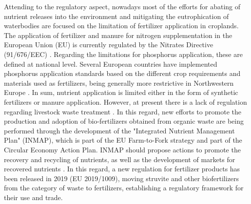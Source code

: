 \begin{refsection}[referencesCh1]
Attending to the regulatory aspect, nowadays most of the efforts for abating of nutrient releases into the environment and mitigating the eutrophication of waterbodies are focused on the limitation of fertilizer application in croplands. The application of fertilizer and manure for nitrogen supplementation in the European Union (EU) is currently regulated by the Nitrates Directive (91/676/EEC) \citep{GRIZZETTI2021102281}. Regarding the limitations for phosphorus application, these are defined at national level. Several European countries have implemented phosphorus application standards based on the different crop requirements and materials used as fertilizers,
being generally more restrictive in Northwestern Europe \citep{amery2014agricultural}. 
In sum, nutrient application is limited either in the form of synthetic fertilizers or manure application. However, at present there is a lack of regulation regarding livestock waste treatment \citep{Piot_Lepetit2012}. In this regard, new efforts to promote the production and adoption of bio-fertilizers obtained from organic waste are being performed through the development of the "Integrated Nutrient Management Plan" (INMAP), which is part of the EU Farm-to-Fork strategy and part of the Circular Economy Action Plan. INMAP should propose actions to promote the recovery and recycling of nutrients, as well as the development of markets for recovered nutrients \citep{ESSP2021, CircularEconomyActionPlan}. In this regard, a new regulation for fertilizer products has been released in 2019 (EU 2019/1009), moving struvite and other biofertilizers from the category of waste to fertilizers, establishing a regulatory framework for their use and trade.


\end{refsection}
